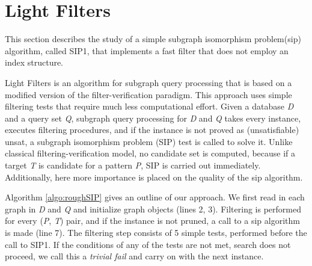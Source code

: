 \documentclass{l4proj}
\begin{document}




\chapter{Light Filters}
\label{ch:sip1}
This section describes the study of a simple subgraph isomorphism problem(\gls{sip}) algorithm, called SIP1, that implements a fast filter that does not employ an index structure.

Light Filters is an algorithm for subgraph query processing that is based on a modified version of the filter-verification paradigm. This approach uses simple filtering tests that require much less computational effort. 
Given a database \emph{D} and a query set \emph{Q}, subgraph query processing for \emph{D} and \emph{Q} takes every instance, executes filtering procedures, and if the instance is not proved as (unsatisfiable) \gls{unsat}, a subgraph isomorphism problem (SIP) test is called to solve it. Unlike classical filtering-verification model, no candidate set is computed, because if a target \emph{T} is candidate for a pattern \emph{P}, SIP is carried out immediately. Additionally, here more importance is placed on the quality of the \gls{sip} algorithm. 

Algorithm \ref{algo:roughSIP} gives an outline of our approach. We first read in each graph in \emph{D} and \emph{Q} and initialize graph objects (lines 2, 3). Filtering is performed for every (\emph{P}, \emph{T}) pair,  and if the instance is not pruned, a call to a \gls{sip} algorithm is made (line 7). The filtering step consists of 5 simple tests, performed before the call to SIP1. If the conditions of any of the tests are not met, search does not proceed, we call this a \emph{trivial fail} and carry on with the next instance. 
\end{document}
